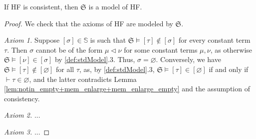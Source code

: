 \begin{theorem}
    \label{stdModel.model_of_consistent}
    \leanok
    If HF is consistent, then $\mathfrak{S}$ is a model of HF.
\end{theorem}

\begin{proof}
    We check that the axioms of HF are modeled by $\mathfrak{S}$.

    \textit{Axiom 1.} Suppose $[\sigma] \in \mathbb{S}$ is such that 
    $\mathfrak{S} \vDash [\tau] \notin [\sigma]$ for every constant term $\tau$.
    Then $\sigma$ cannot be of the form $\mu \lhd \nu$ for some constant terms $\mu, \nu$,
    as otherwise $\mathfrak{S} \vDash [\nu] \in [\sigma]$ by \ref{def:stdModel}.3.
    Thus, $\sigma = \varnothing$.
    Conversely, we have $\mathfrak{S} \vDash [\tau] \notin [\varnothing]$ for all $\tau$,
    as, by \ref{def:stdModel}.3, $\mathfrak{S} \vDash [\tau] \in [\varnothing]$ if and only if
    $\vdash \tau \in \varnothing$, and the latter contradicts 
    Lemma \ref{lem:notin_empty+mem_enlarge+mem_enlarge_empty} and the assumption of consistency.

    \textit{Axiom 2.} ...

    \textit{Axiom 3.} ...

\end{proof}